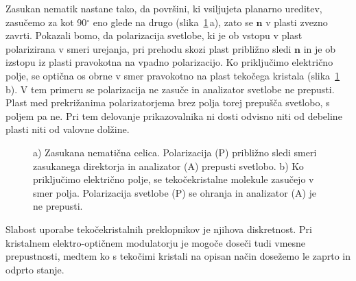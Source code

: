 Zasukan  nematik nastane tako, da površini, ki vsiljujeta planarno ureditev,
zasučemo za kot 90$^\circ$ eno glede na drugo (slika~\ref{LCD1}\,a), zato se $\mathbf{n}$ 
v plasti zvezno zavrti.
Pokazali bomo, da polarizacija svetlobe, ki je ob vstopu 
v plast polarizirana v smeri urejanja, pri prehodu skozi plast približno
sledi $\mathbf{n}$ in je ob izstopu iz plasti pravokotna
na vpadno polarizacijo. Ko priključimo električno polje, se optična os 
obrne v smer pravokotno na plast tekočega kristala (slika~\ref{LCD1}\,b). V tem primeru 
se polarizacija ne zasuče in analizator svetlobe ne prepusti. Plast med prekrižanima
polarizatorjema brez polja torej prepušča svetlobo, s poljem pa ne. Pri tem
delovanje prikazovalnika ni dosti odvisno niti od debeline plasti niti
od valovne dolžine. 
\begin{figure}[h!]
\centering
\def\svgwidth{105truemm} 

\caption{a) Zasukana nematična celica. 
Polarizacija (P) približno sledi smeri zasukanega direktorja in analizator (A) 
prepusti svetlobo. b) Ko priključimo električno polje, se tekočekristalne molekule
zasučejo v smer polja. Polarizacija svetlobe (P) se ohranja in analizator (A) 
je ne prepusti. }
\label{LCD1}
\end{figure}

Slabost uporabe tekočekristalnih preklopnikov je njihova diskretnost. Pri 
kristalnem elektro-optičnem modulatorju je mogoče doseči tudi vmesne
prepustnosti, medtem ko s tekočimi kristali na opisan način
dosežemo le zaprto in odprto stanje.

